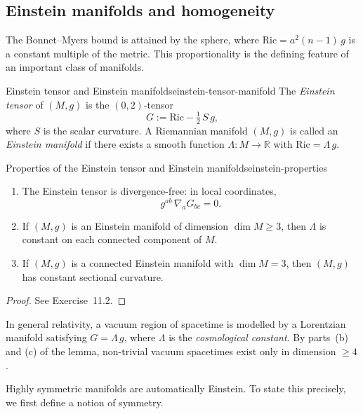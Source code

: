\subsection{Einstein manifolds and homogeneity}

The Bonnet--Myers bound is attained by the sphere, where $\mathrm{Ric} = a^2(n - 1)\, g$ is a constant multiple of the metric. This proportionality is the defining feature of an important class of manifolds.

\begin{colordef}{Einstein tensor and Einstein manifolds}{einstein-tensor-manifold}
The \emph{Einstein tensor} of $(M, g)$ is the $(0, 2)$-tensor
\[
G := \mathrm{Ric} - \tfrac{1}{2}\, S\, g,
\]
where $S$ is the scalar curvature. A Riemannian manifold $(M, g)$ is called an \emph{Einstein manifold} if there exists a smooth function $\Lambda \colon M \to \mathbb{R}$ with $\mathrm{Ric} = \Lambda\, g$.
\end{colordef}

\begin{colorlem}{Properties of the Einstein tensor and Einstein manifolds}{einstein-properties}
\begin{enumerate}
    \item[(a)] The Einstein tensor is divergence-free: in local coordinates,
    \[
    g^{ab}\, \nabla_a G_{bc} = 0.
    \]
    \item[(b)] If $(M, g)$ is an Einstein manifold of dimension $\dim M \geqslant 3$, then $\Lambda$ is constant on each connected component of $M$.
    \item[(c)] If $(M, g)$ is a connected Einstein manifold with $\dim M = 3$, then $(M, g)$ has constant sectional curvature.
\end{enumerate}
\end{colorlem}

\begin{proof}
See Exercise~11.2.
\end{proof}

\begin{colremark}
In general relativity, a vacuum region of spacetime is modelled by a Lorentzian manifold satisfying $G = \Lambda\, g$, where $\Lambda$ is the \emph{cosmological constant}. By parts~(b) and (c) of the lemma, non-trivial vacuum spacetimes exist only in dimension $\geqslant 4$.
\end{colremark}


Highly symmetric manifolds are automatically Einstein. To state this precisely, we first define a notion of symmetry.

